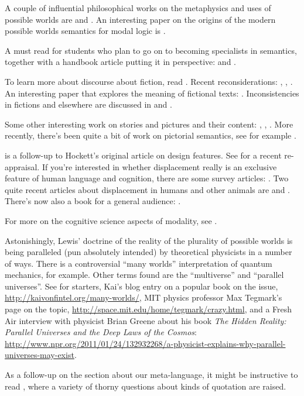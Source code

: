 A couple of influential philosophical works on the metaphysics and uses of
possible worlds are \cite{kripke:naming:80} and
\cite{lewis-1986-PluralityWorlds}. An interesting paper on the origins of the
modern possible worlds semantics for modal logic is
\cite{copeland-2002-genesis}.

A must read for students who plan to go on to becoming specialists in semantics,
together with a handbook article putting it in perspective:
\cite{montague-1973-ProperTreatmentQuantification} and
\cite{partee-hendriks-2011-MontagueGrammar}.

To learn more about discourse about fiction, read \cite{lewis-1978-fiction}.
Recent reconsiderations: \cite{bonomi-zucchi-2003-fiction},
\cite{hanley-2004-lewis-fiction}, \cite{proudfoot-2006-fiction}. An interesting
paper that explores the meaning of fictional texts:
\cite{bauer-beck-2014-fiction}. Inconsistencies in fictions and elsewhere are
discussed in \cite{varzi-1997-inconsistency} and
\cite{lewis-1982-equivocators}.
  
Some other interesting work on stories and pictures and their content:
\cite{ross-1997-media}, \cite{zucchi-2001-tense-fiction},
\cite{blumson-2010-PicturesPerspectivePossibility}. More recently, there's been
quite a bit of work on pictorial semantics, see for example
\cite{abusch-rooth-2017-pictorial,greenberg-2018-pictorial,
  maier-bimpikou-2019-pictorial}.

\cite{hockett-altmann-1968-design} is a follow-up to Hockett's original article
on design features. See \cite{emonds-2011-primate-human} for a recent
re-appraisal. If you're interested in whether displacement really is an
exclusive feature of human language and cognition, there are some survey
articles: \cite{cheke-clayton-2010-mtt,redshaw-2014-mtt}. Two quite recent
articles about displacement in humans and other animals are
\cite{leahy-carey-2020-modal-acquisition} and
\cite{redshaw-suddendorf-2020-timelines}. There's now also a book for a general
audience: \cite{suddendorf-redshaw-bulley-2022-InventionTomorrowNaturalHistory}.

For more on the cognitive science aspects of modality, see \cite{phillips-knobe-2018-PsychologicalRepresentationModality, grigoroglou-ganea-2022-LanguageMechanismReasoningPossibilities,
  phillips-kratzer-2022-DecomposingModalThought}.

\enlargethispage{24pt}
Astonishingly, Lewis' doctrine of the reality of the plurality of possible
worlds is being paralleled (pun absolutely intended) by theoretical physicists
in a number of ways. There is a controversial ``many worlds'' interpretation of
quantum mechanics, for example. Other terms found are the ``multiverse'' and
``parallel universes''. See for starters, Kai's blog entry on a popular book on
the issue, \url{http://kaivonfintel.org/many-worlds/}, MIT physics professor Max
Tegmark's page on the topic, \url{http://space.mit.edu/home/tegmark/crazy.html},
and a Fresh Air interview with physicist Brian Greene about his book \emph{The
  Hidden Reality: Parallel Universes and the Deep Laws of the Cosmos}:
\url{http://www.npr.org/2011/01/24/132932268/a-physicist-explains-why-parallel-universes-may-exist}.

As a follow-up on the section about our meta-language, it might be instructive
to read \cite{saka-2017-BlahBlahBlah}, where a variety of thorny questions about
kinds of quotation are raised.

